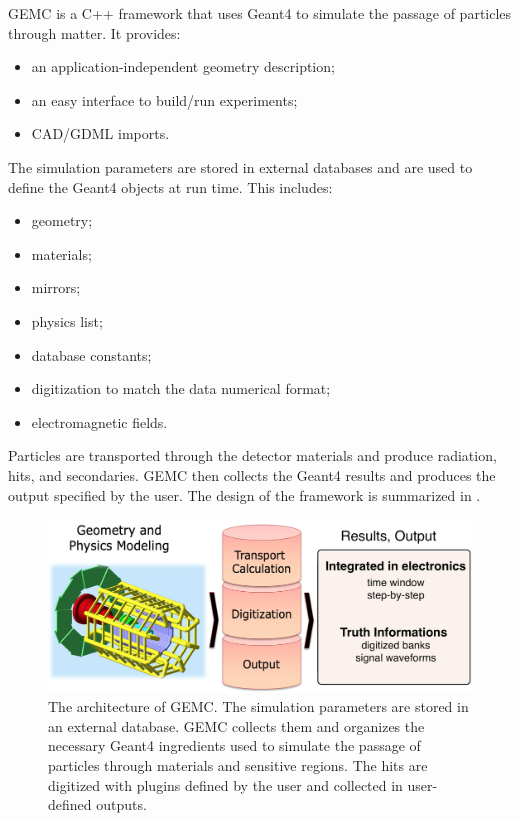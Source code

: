 GEMC is a C++ framework that uses Geant4 \cite{geant4} to simulate the passage of particles through matter. It provides:
\begin{itemize}
	\item an application-independent geometry description;
	\item an easy interface to build/run experiments;
	\item CAD/GDML imports.
\end{itemize}

The simulation parameters are stored in external databases and are used to define the Geant4 objects at run time. This
includes:
\begin{itemize}
	\item geometry;
	\item materials;
	\item mirrors;
	\item physics list;
	\item database constants;
	\item digitization to match the data numerical format;
	\item electromagnetic fields.
\end{itemize}

Particles are transported through the detector materials and produce radiation, hits, and secondaries.
GEMC then collects the Geant4 results and produces the output specified by the user.
The design of the framework is summarized in .

\begin{figure}
	\centering
	\includegraphics[width=1.0\columnwidth,keepaspectratio]{img/gemcDesign.png}
	\caption{The architecture of GEMC. The simulation parameters are stored in an external database. GEMC collects
             them and organizes the necessary Geant4 ingredients used to simulate the
             passage of particles through materials and sensitive regions. The hits are digitized with
             plugins defined by the user and collected in user-defined outputs.  }
	\label{fig:gemcDesign}
\end{figure}

